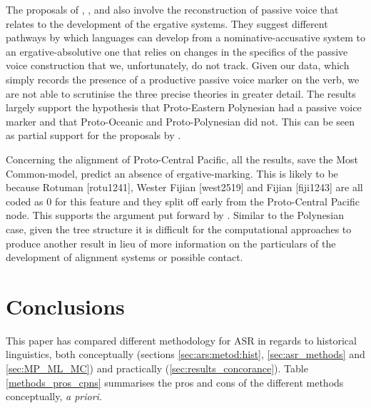 \documentclass[12pt,letterpaper]{article}
\begin{document}
The proposals of \citet{hale_1968}, \citet{hohepa_1967, hohepa_1969}, and \citet{chung1978} also involve the reconstruction of passive voice that relates to the development of the ergative systems. They suggest different pathways by which languages can develop from a nominative-accusative system to an ergative-absolutive one that relies on changes in the specifics of the passive voice construction that we, unfortunately, do not track. Given our data, which simply records the presence of a productive passive voice marker on the verb, we are not able to scrutinise the three precise theories in greater detail. The results largely support the hypothesis that Proto-Eastern Polynesian had a passive voice marker and that Proto-Oceanic and Proto-Polynesian did not. This can be seen as partial support for the proposals by \citet{hale_1968, hohepa_1967, hohepa_1969, chung1978}.

Concerning the alignment of Proto-Central Pacific, all the results, save the Most Common-model, predict an absence of ergative-marking. This is likely to be because Rotuman [rotu1241], Wester Fijian [west2519] and Fijian [fiji1243] are all coded as 0 for this feature and they split off early from the Proto-Central Pacific node. This supports the argument put forward by \citet{ball2007ergativity}. Similar to the Polynesian case, given the tree structure it is difficult for the computational approaches to produce another result in lieu of more information on the particulars of the development of alignment systems or possible contact.

\FloatBarrier
\section{Conclusions}
This paper has compared different methodology for ASR in regards to historical linguistics, both conceptually (sections \ref{sec:ars:metod:hist}, \ref{sec:asr_methods} and \ref{sec:MP_ML_MC}) and practically (\ref{sec:results_concorance}). Table \ref{methods_pros_cpns} summarises the pros and cons of the different methods conceptually, \emph{a priori}.
\end{document}
